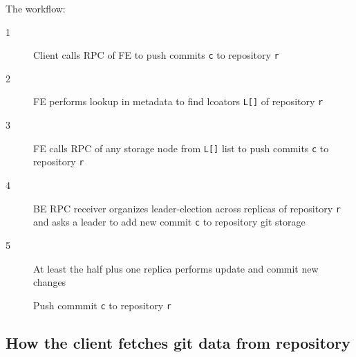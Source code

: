 \documentclass[nonacm=true]{acmart}
\newcommand{\code}[1]{\texttt{#1}}
\begin{document}
The workflow:
\begin{description}
  \item[1] Client calls RPC of FE to push commits \code{c} to repository \code{r}
  \item[2] FE performs lookup in metadata to find lcoators \code{L[]} of repository \code{r}
  \item[3] FE calls RPC of any storage node from \code{L[]} list to push commits \code{c} to
    repository \code{r}
  \item[4] BE RPC receiver organizes leader-election across replicas of repository \code{r}
    and asks a leader to add new commit \code{c} to repository git storage
  \item[5] At least the half plus one replica performs update and commit new changes
\end{description}

\begin{figure}
  \begin{center}
  \end{center}
  \caption{Push commmit \code{c} to repository \code{r}}
\label{fig:ex-push-to-repo}
\end{figure}

\subsection{How the client fetches git data from repository}
\end{document}

